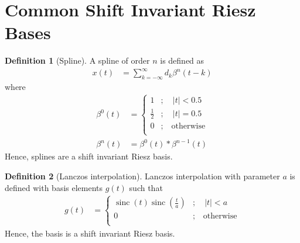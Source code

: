 \documentclass[titlepage, fleqn, a4paper, 12pt, twoside]{article}
\theoremstyle{definition}
\newtheorem{definition}{Definition}
\theoremstyle{theorem}
\DeclareMathOperator{\sinc}{\mathrm{sinc}}
\begin{document}
\section{Common Shift Invariant Riesz Bases}

\begin{definition}[Spline]
	A spline of order $n$ is defined as
	\begin{align*}
		x(t) &= \sum\limits_{k = -\infty}^{\infty} d_k \beta^n(t - k)
	\end{align*}
	where
	\begin{align*}
		\beta^0(t) &=
			\begin{cases}
				1 &;\quad |t| < 0.5\\
				\frac{1}{2} &;\quad |t| = 0.5\\
				0 &;\quad \text{otherwise}\\
			\end{cases}\\
		\beta^n(t) &= \beta^0(t) \ast \beta^{n - 1}(t)
	\end{align*}
	Hence, splines are a shift invariant Riesz basis.
\end{definition}

\begin{definition}[Lanczos interpolation]
	Lanczos interpolation with parameter $a$ is defined with basis elements $g(t)$ such that
	\begin{align*}
		g(t) &=
			\begin{cases}
				\sinc(t) \sinc\left( \frac{t}{a} \right) &;\quad |t| < a\\
				0 &;\quad \text{otherwise}\\
			\end{cases}
	\end{align*}
	Hence, the basis is a shift invariant Riesz basis.
\end{definition}

\clearpage
\printindex
\end{document}
